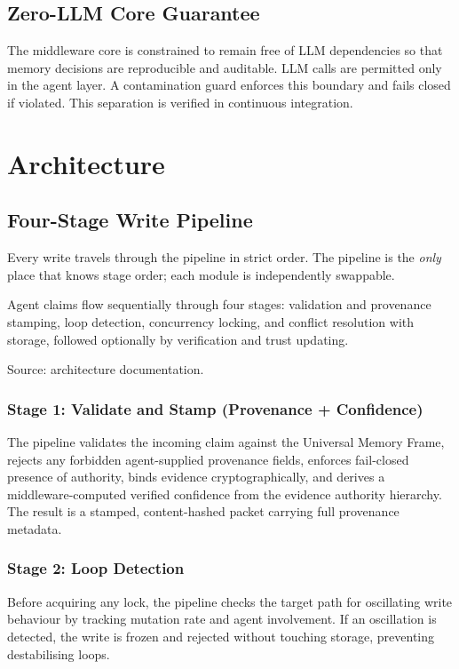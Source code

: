 \documentclass[12pt,a4paper]{article}
\begin{document}
\subsection{Zero-LLM Core Guarantee}
The middleware core is constrained to remain free of LLM dependencies so that memory decisions are reproducible and auditable. LLM calls are permitted only in the agent layer. A contamination guard enforces this boundary and fails closed if violated. This separation is verified in continuous integration.

\section{Architecture}

\subsection{Four-Stage Write Pipeline}
Every write travels through the pipeline in strict order. The pipeline is the \emph{only} place that knows stage order; each module is independently swappable.

Agent claims flow sequentially through four stages: validation and provenance stamping, loop detection, concurrency locking, and conflict resolution with storage, followed optionally by verification and trust updating.

Source: architecture documentation.

\subsubsection{Stage 1: Validate and Stamp (Provenance + Confidence)}
The pipeline validates the incoming claim against the Universal Memory Frame, rejects any forbidden agent-supplied provenance fields, enforces fail-closed presence of authority, binds evidence cryptographically, and derives a middleware-computed verified confidence from the evidence authority hierarchy. The result is a stamped, content-hashed packet carrying full provenance metadata.

\subsubsection{Stage 2: Loop Detection}
Before acquiring any lock, the pipeline checks the target path for oscillating write behaviour by tracking mutation rate and agent involvement. If an oscillation is detected, the write is frozen and rejected without touching storage, preventing destabilising loops.
\end{document}
